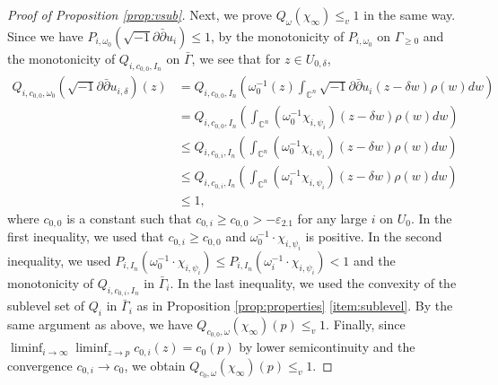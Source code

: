 \documentclass[10pt,a4paper]{amsart}
\numberwithin{equation}{section}
\newcommand{\delb}{\sqrt{-1}\partial\bar{\partial}}
\begin{document}
\begin{proof}[Proof of Proposition \ref{prop:vsub}]
    Next, we prove $Q_\omega(\chi_\infty)\le_v1$ in the same way. Since we have $P_{i,\omega_0}(\delb u_i)\le1$, by the monotonicity of $P_{i,\omega_0}$ on $\Gamma_{\ge0}$ and the monotonicity of $Q_{i,c_{0,0},I_n}$ on $\bar{\Gamma}$,  
    we see that for $z \in U_{0,\delta}$,
    \begin{equation}\label{eq:Qconv}
        \begin{split}
        Q_{i,c_{0,0},\omega_0}(\delb u_{i,\delta})(z)
        &=Q_{i,c_{0,0},I_n}\left(\omega^{-1}_0(z) \int_{\mathbb{C}^n}\delb u_i(z-\delta w)\rho(w)dw
        \right)\\
        &=Q_{i,c_{0,0},I_n}\left( \int_{\mathbb{C}^n}(\omega^{-1}_0 \chi_{i,\psi_i})(z-\delta w)\rho(w)dw
        \right)\\
        &\le Q_{i,c_{0,i},I_n}\left( \int_{\mathbb{C}^n}(\omega^{-1}_0 \chi_{i,\psi_i})(z-\delta w)\rho(w)dw
        \right)\\
        &\le Q_{i,c_{0,i},I_n}\left( \int_{\mathbb{C}^n}(\omega^{-1}_i \chi_{i,\psi_i})(z-\delta w)\rho(w)dw
        \right)\\
        &\le 1,
        \end{split}
    \end{equation}
    where $c_{0,0}$ is a constant such that $c_{0,i}\ge c_{0,0}>-\varepsilon_{2.1}$ for any large $i$ on $U_0$.
    In the first inequality, we used that $c_{0,i}\ge c_{0,0}$ and $\omega_0^{-1}\cdot\chi_{i,\psi_i}$ is positive. In the second inequality, we used $P_{i,I_n}(\omega_0^{-1}\cdot\chi_{i,\psi_i})\le P_{i,I_n}(\omega_i^{-1}\cdot\chi_{i,\psi_i})<1$ and the monotonicity of $Q_{i,c_{0,i},I_n}$ in $\bar{\Gamma}_i$. In the last inequality, we used the convexity of the sublevel set of $Q_i$ in $\bar{\Gamma}_i$ as in Proposition \ref{prop:properties} \ref{item:sublevel}. By the same argument as above, we have $Q_{c_{0,0},\omega}(\chi_\infty)(p)\le_v 1$. Finally, since $\liminf_{i\to\infty}\liminf_{z\to p} c_{0,i}(z)=c_0(p)$ by lower semicontinuity and the convergence $c_{0,i}\to c_0$, we obtain $Q_{c_0,\omega}(\chi_\infty)(p)\le_v1$. 
\end{proof}
\end{document}
